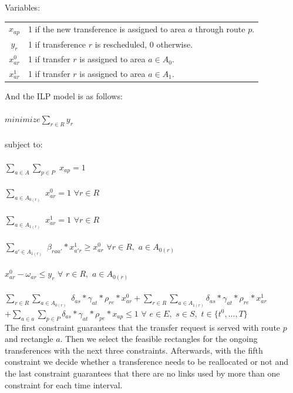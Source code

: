 \documentclass[11pt,a4paper]{article}
\begin{document}
Variables:

\begin{table}[H]
\small
\begin{tabular}{c l}
$x_{ap}$ & 1 if the new transference is assigned to area $a$ through route $p$.\\
$y_{r}$ & 1 if transference $r$ is rescheduled, 0 otherwise.\\
$x^{0}_{ar}$ & 1 if transfer $r$ is assigned to area $a \in A_{0}$.\\
$x^{1}_{ar}$ & 1 if transfer $r$ is assigned to area $a \in A_{1}$.\\
\end{tabular}
\end{table}

And the ILP model is as follows:\\\\

$minimize \sum_{r\in R} y_{r} $\\\\

subject to:\\\\

$\sum_{a \in A} \sum_{p \in P}$ $x_{ap} = 1$\\\\
$\sum_{a \in A_{0(r)}}$ $x^{0}_{ar}=1$    $\forall r \in R$\\\\
$\sum_{a \in A_{1(r)}}$ $x^{1}_{ar}=1$    $\forall r \in R$\\\\
$\sum_{a' \in A_{1(r)}}$ $\beta_{raa'}*x^{1}_{a'r} \geq x^{0}_{ar}$     $\forall r \in R,$ $a \in A_{0(r)}$\\\\
$x^{0}_{ar} - \omega_{ar} \leq y_{r}$     $\forall$ $r \in R,$ $a \in A_{0(r)}$\\\\
$\sum_{r \in R} \sum_{a \in A_{0(r)}}$ $\delta_{as} * \gamma_{at} * \rho_{re} * x^{0}_{ar} + \sum_{r \in R} \sum_{a \in A_{1(r)}} \delta_{as} * \gamma_{at} * \rho_{re} * x^{1}_{ar}$\\ 
$+ \sum_{a \in a} \sum_{p \in P} \delta_{as} * \gamma_{at} * \rho_{pe} * x_{ap} \leq 1$    $\forall$ $e \in E,$ $s \in S,$ $t \in {\{t^{0},...,T\}}$\\

The first constraint guarantees that the transfer request is served with route $p$ and rectangle $a$. Then we select the feasible rectangles for the ongoing transferences with the next three constraints. Afterwards, with the fifth constraint we decide whether a transference needs to be reallocated or not and the last constraint guarantees that there are no links used by more than one constraint for each time interval. \\
\end{document}

